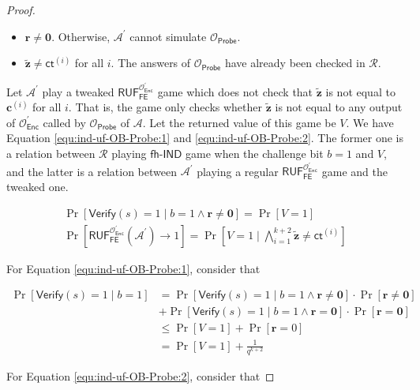 \begin{proof}
\begin{itemize}
	\item $\mathbf{r} \neq \mathbf{0}$. Otherwise, $\mathcal{A}^\prime$ cannot simulate $\mathcal{O}_\textsf{Probe}$. 

	\item $\mathbf{\tilde{z}} \neq \textsf{ct}^{(i)}$ for all $i$. The answers of $\mathcal{O}_\textsf{Probe}$ have already been checked in $\mathcal{R}$. 
\end{itemize}

Let $\mathcal{A}^\prime$ play a tweaked $\textsf{RUF}_\textsf{FE}^{\mathcal{O}^\prime_{\textsf{Enc}}}$ game which does not check that $\mathbf{\tilde{z}}$ is not equal to $\mathbf{c}^{(i)}$ for all $i$. That is, the game only checks whether $\mathbf{\tilde{z}}$ is not equal to any output of $\mathcal{O}^\prime_\textsf{Enc}$ called by $\mathcal{O}_\textsf{Probe}$ of $\mathcal{A}$. Let the returned value of this game be $V$. We have Equation \ref{equ:ind-uf-OB-Probe:1} and \ref{equ:ind-uf-OB-Probe:2}. The former one is a relation between $\mathcal{R}$ playing $\textsf{fh-IND}$ game when the challenge bit $b=1$ and $V$, and the latter is a relation between $\mathcal{A}^\prime$ playing a regular $\textsf{RUF}_\textsf{FE}^{\mathcal{O}^\prime_{\textsf{Enc}}}$ game and the tweaked one.

\begin{gather}
	\Pr[\textsf{Verify}(s) = 1 \mid b = 1 \wedge \mathbf{r} \neq \mathbf{0}] = \Pr[V = 1] \label{equ:ind-uf-OB-Probe:1} \\
	\Pr[\textsf{RUF}_\textsf{FE}^{\mathcal{O}^\prime_{\textsf{Enc}}}(\mathcal{A}^\prime) \to 1] = \Pr\left[ V = 1 \mid \bigwedge_{i=1}^{k+2} \mathbf{\tilde{z}} \neq \textsf{ct}^{(i)} \right] \label{equ:ind-uf-OB-Probe:2}
\end{gather}

\noindent For Equation \ref{equ:ind-uf-OB-Probe:1}, consider that

\begin{align*}
	\Pr[\textsf{Verify}(s) = 1 \mid b = 1]
	&= \Pr[\textsf{Verify}(s) = 1 \mid b = 1 \wedge \mathbf{r} \neq \mathbf{0}] \cdot \Pr[\mathbf{r} \neq \mathbf{0}] \\
	&+ \Pr[\textsf{Verify}(s) = 1 \mid b = 1 \wedge \mathbf{r} = \mathbf{0}] \cdot \Pr[\mathbf{r} = \mathbf{0}] \\
	&\leq \Pr[V = 1] + \Pr[\mathbf{r} = 0] \\
	&= \Pr[V = 1] + \frac{1}{q^{k+2}} 
\end{align*}

\noindent For Equation \ref{equ:ind-uf-OB-Probe:2}, consider that


\end{proof}
